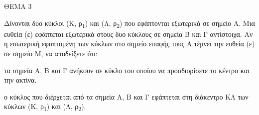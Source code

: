 
ΘΕΜΑ 3

Δίνονται δυο κύκλοι (Κ, ρ\textsubscript{1}) και (Λ, ρ\textsubscript{2}) που εφάπτονται εξωτερικά σε σημείο Α. Μια ευθεία (ε) εφάπτεται εξωτερικά στους δυο κύκλους σε σημεία Β και Γ αντίστοιχα. Αν η εσωτερική εφαπτομένη των κύκλων στο σημείο επαφής τους Α τέμνει την ευθεία (ε) σε σημείο Μ, να αποδείξετε ότι:

\begin{alist}
\item τα σημεία Α, Β και Γ ανήκουν σε κύκλο του οποίου να προσδιορίσετε το κέντρο και την ακτίνα. 

\item ο κύκλος που διέρχεται από τα σημεία Α, Β και Γ εφάπτεται στη διάκεντρο ΚΛ των κύκλων (Κ, ρ\textsubscript{1}) και (Λ, ρ\textsubscript{2}). 
\end{alist}
